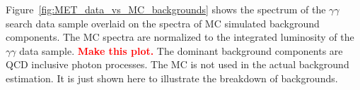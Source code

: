 \documentclass[dissertation.tex]{subfiles}
\begin{document}

%

Figure~\ref{fig:MET_data_vs_MC_backgrounds} shows the \MET spectrum of the $\gamma\gamma$ search data sample overlaid on the \MET spectra of MC simulated background components.  The MC spectra are normalized to the integrated luminosity of the $\gamma\gamma$ data sample.  \textcolor{red}{\textbf{Make this plot.}}  The dominant background components are QCD inclusive photon processes.  The MC is not used in the actual background estimation.  It is just shown here to illustrate the breakdown of backgrounds.

\end{document}
